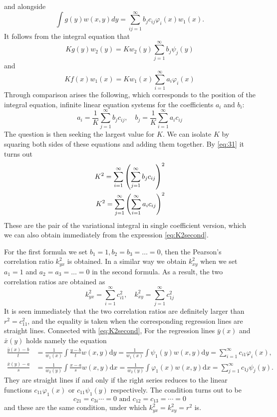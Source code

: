 \documentclass{article}
\begin{document}
and alongside
$$
\int g(y) w(x, y) d y=\sum_{i j=1}^{\infty} b_{j} c_{i j} \varphi_{i}(x) w_{1}(x).
$$
It follows from the integral equation that 
$$
K  g(y) w_{2}(y)=K w_{2}(y) \sum_{j=1}^{\infty} b_{j} \psi_{j}(y)
$$
and
$$
K f(x) w_{1}(x)=K w_{1}(x) \sum_{i=1}^{\infty} a_{i} \varphi_{i}(x)
$$
Through comparison arises the following, which corresponds to the position of the integral equation,
infinite linear equation systems for the coefficients $a_i$
and $b_i$:
\begin{equation}\label{eq:34}
a_{i}=\frac{1}{K} \sum_{j=1}^{\infty} b_{j} c_{i j}, \quad b_{j}=\frac{1}{K} \sum_{i=1}^{\infty} a_{i} c_{i j}
\end{equation}
The question is then seeking the largest value for $K$.
We can isolate $K$ by squaring both sides of these equations
and adding them together. By \eqref{eq:31} it turns out
\begin{align}
K^{2}=\sum_{i=1}^{\infty}\left(\sum_{j=1}^{\infty} b_{j} c_{i j}\right)^{2} \notag\\
K^{2}=\sum_{j=1}^{\infty}\left(\sum_{i=1}^{\infty} a_{i} c_{i j}\right)^{2}\label{eq:35}
\end{align}
These are the pair of the variational integral in single coefficient version, which we can also obtain immediately from the expression
\eqref{eq:K2second}.

For the first formula we set $b_1=1, b_2=b_3=\dots=0$,
then the Pearson's correlation ratio $k^2_{yx}$ is obtained.
In a similar way we obtain $k^2_{xy}$ when we set
$a_1=1$ and $a_2=a_3=\dots=0$ in the second formula. As
a result, the two correlation ratios are obtained as
\begin{equation}\label{eq:46}
    k_{y x}^{2}=\sum_{i=1}^{\infty} c_{i 1}^{2}, \quad k_{x y}^{2}=\sum_{j=1}^{\infty} c_{1 j}^{2}
\end{equation}
It is seen immediately that the two correlation ratios are definitely larger
than $r^2=c_{11}^2$, and the equality is taken when the 
corresponding regression lines are straight lines.
Connected with \eqref{eq:K2second}, For the regression lines $\bar{y}(x)$
and $\bar{x}(y)$ holds namely the equation
\begin{align*}
\frac{\bar{y}(x)-b}{t}&=\frac{1}{w_{1}(x)} \int \frac{y-b}{t} w(x, y) \mathrm{d} y=\frac{1}{w_{1}(x)} \int \psi_{1}(y) w(x, y) \mathrm{d} y=\sum_{i=1}^{\infty} c_{i1} \varphi_{i}(x),\\
    \frac{\bar{x}(y)-a}{s}&=\frac{1}{w_{2}(y)} \int \frac{x-a}{s} w(x, y) \mathrm{d} x=\frac{1}{w_{2}(y)} \int \varphi_{1}(x) w(x, y) \mathrm{d} x=\sum_{j=1}^{\infty} c_{1 j} \psi_{j}(y).
\end{align*}
They are straight lines if and only if
the right series
reduces to the linear functions
$c_{11}\varphi_1(x)$
or $c_{11}\psi_1(y)$ respectively.
The condition turns out to be
\begin{equation}\label{eq:37}
    c_{21}=c_{3 i} \cdots=0 \text { and } c_{12}=c_{13}=\cdots=0
\end{equation}
and these are the same condition, under which 
$k^2_{yx} = k^2_{xy}=r^2$ is.
\end{document}
